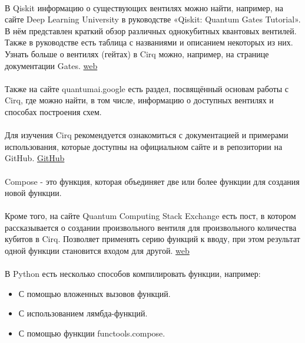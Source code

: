 \documentclass[12pt,a4paper]{article}
\begin{document}
		\hspace{1em}\\
		В Qiskit информацию о существующих вентилях можно найти, например, на сайте Deep Learning University в руководстве «Qiskit: Quantum Gates Tutorial». В нём представлен краткий обзор различных однокубитных квантовых вентилей. Также в руководстве есть таблица с названиями и описанием некоторых из них.
		Узнать больше о вентилях (гейтах) в Cirq можно, например, на странице документации Gates.
		\href{https://deeplearninguniversity.com/qiskit/qiskit-quantum-gates/}{web}\\
		\hspace{1em}\\
		Также на сайте quantumai.google есть раздел, посвящённый основам работы с Cirq, где можно найти, в том числе, информацию о доступных вентилях и способах построения схем.\\
		\hspace{1em}\\
		Для изучения Cirq рекомендуется ознакомиться с документацией и примерами использования, которые доступны на официальном сайте и в репозитории на GitHub.
		\href{https://github.com/quantumlib/Cirq?ysclid=maxou3q828463071125}{GitHub}\\
		\hspace{1em}\\
		Compose - это функция, которая объединяет две или более функции для создания новой функции.\\
		\hspace{1em}\\
		Кроме того, на сайте Quantum Computing Stack Exchange есть пост, в котором рассказывается о создании произвольного вентиля для произвольного количества кубитов в Cirq. Позволяет применять серию функций к вводу, при этом результат одной функции становится входом для другой.
		\href{https://translated.turbopages.org/proxy\_u/en-ru.ru.fc1f353f-682d8ff9-23362e3b-74722d776562/https/quantumcomputing.stackexchange.com/questions/14266/cirq-creating-an-arbitrary-gate-for-an-arbitrary-number-of-qubits}{web}\\
		\hspace{1em}\\
		В Python есть несколько способов компилировать функции, например: 
		\begin{itemize}
			
			\item С помощью вложенных вызовов функций.\\
			\item С использованием лямбда-функций.\\
			\item С помощью функции functools.compose.\\\end{itemize}
\end{document}
